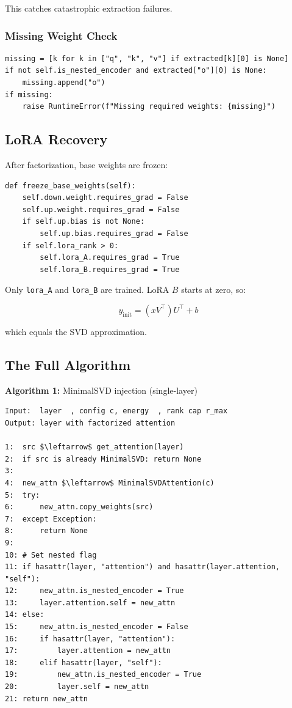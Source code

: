 This catches catastrophic extraction failures.

\subsubsection{Missing Weight Check}

\begin{lstlisting}
missing = [k for k in ["q", "k", "v"] if extracted[k][0] is None]
if not self.is_nested_encoder and extracted["o"][0] is None:
    missing.append("o")
if missing:
    raise RuntimeError(f"Missing required weights: {missing}")
\end{lstlisting}

\subsection{LoRA Recovery}

After factorization, base weights are frozen:

\begin{lstlisting}
def freeze_base_weights(self):
    self.down.weight.requires_grad = False
    self.up.weight.requires_grad = False
    if self.up.bias is not None:
        self.up.bias.requires_grad = False
    if self.lora_rank > 0:
        self.lora_A.requires_grad = True
        self.lora_B.requires_grad = True
\end{lstlisting}

Only \texttt{lora\_A} and \texttt{lora\_B} are trained. LoRA $B$ starts at zero, so:

\[
y_{\text{init}} = (x V^\top) U^\top + b
\tag{4.8}
\]

which equals the SVD approximation.

\subsection{The Full Algorithm}

\textbf{Algorithm 1:} MinimalSVD injection (single-layer)
\begin{lstlisting}
Input:  layer  , config c, energy  , rank cap r_max
Output: layer with factorized attention

1:  src $\leftarrow$ get_attention(layer)
2:  if src is already MinimalSVD: return None
3:
4:  new_attn $\leftarrow$ MinimalSVDAttention(c)
5:  try:
6:      new_attn.copy_weights(src)
7:  except Exception:
8:      return None
9:
10: # Set nested flag
11: if hasattr(layer, "attention") and hasattr(layer.attention, "self"):
12:     new_attn.is_nested_encoder = True
13:     layer.attention.self = new_attn
14: else:
15:     new_attn.is_nested_encoder = False
16:     if hasattr(layer, "attention"):
17:         layer.attention = new_attn
18:     elif hasattr(layer, "self"):
19:         new_attn.is_nested_encoder = True
20:         layer.self = new_attn
21: return new_attn
\end{lstlisting}

